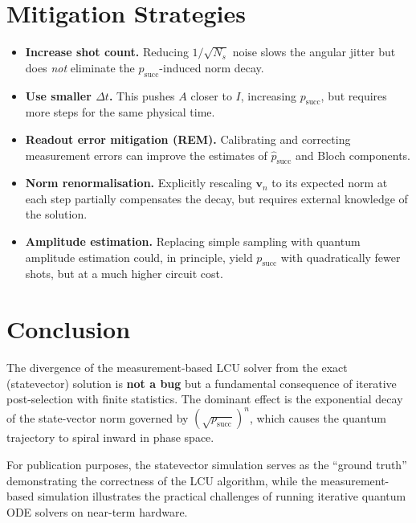 \documentclass[11pt,a4paper]{article}
\begin{document}
\section{Mitigation Strategies}

\begin{itemize}
\item \textbf{Increase shot count.}  Reducing \(1/\sqrt{N_s}\) noise
      slows the angular jitter but does \emph{not} eliminate the
      \(p_{\text{succ}}\)-induced norm decay.
\item \textbf{Use smaller \(\Delta t\).}  This pushes \(A\) closer to
      \(I\), increasing \(p_{\text{succ}}\), but requires more steps for
      the same physical time.
\item \textbf{Readout error mitigation (REM).}  Calibrating and
      correcting measurement errors can improve the estimates of
      \(\hat p_{\text{succ}}\) and Bloch components.
\item \textbf{Norm renormalisation.}  Explicitly rescaling \(\mathbf v_n\)
      to its expected norm at each step partially compensates the decay,
      but requires external knowledge of the solution.
\item \textbf{Amplitude estimation.}  Replacing simple sampling with
      quantum amplitude estimation could, in principle, yield
      \(p_{\text{succ}}\) with quadratically fewer shots, but at a much
      higher circuit cost.
\end{itemize}

\section{Conclusion}

The divergence of the measurement-based LCU solver from the exact
(statevector) solution is \textbf{not a bug} but a fundamental
consequence of iterative post-selection with finite statistics.
The dominant effect is the exponential decay of the state-vector norm
governed by \((\sqrt{p_{\text{succ}}})^n\), which causes the quantum
trajectory to spiral inward in phase space.

For publication purposes, the statevector simulation serves as the
``ground truth'' demonstrating the correctness of the LCU algorithm,
while the measurement-based simulation illustrates the practical
challenges of running iterative quantum ODE solvers on near-term
hardware.
\end{document}
